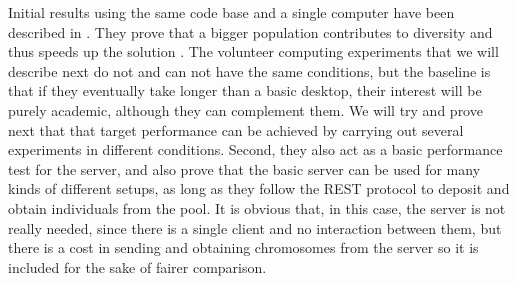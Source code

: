 \documentclass[journal,onecolumn]{IEEEtran}
\begin{document}
Initial results using the same code base and a single computer have
been described in \cite{2016arXiv160101607M}. They prove that a bigger population
contributes to diversity and thus speeds up the solution
\cite{DBLP:conf/lion/LaredoDFGB13}. The volunteer computing 
experiments that we will describe next do not and can not have the
same conditions, but
the baseline is that if they eventually take longer than a basic
desktop, their interest will be purely academic, although they can
complement them. We will try and
prove next that that target performance can be achieved by carrying
out several experiments in different conditions. Second, they also act
as a basic performance test for the server, and also prove that the
basic server can be used for many kinds of different setups, as long
as they follow the REST protocol to deposit and obtain individuals
from the pool. It is obvious that, in this case, the server is not
really needed, since there is a single client and no interaction
between them, but there is a cost in sending and obtaining chromosomes
from the server so it is included for the sake of fairer comparison.
\end{document}
